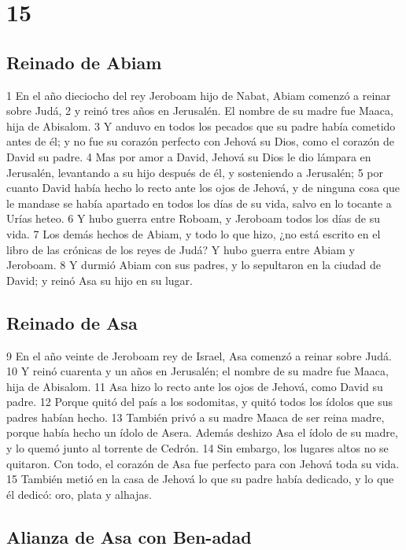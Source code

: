 \chapter{15}

\section*{Reinado de Abiam}

 

1 En el año dieciocho del rey Jeroboam hijo de Nabat, Abiam comenzó a reinar sobre Judá, 
2 y reinó tres años en Jerusalén. El nombre de su madre fue Maaca, hija de Abisalom.
3 Y anduvo en todos los pecados que su padre había cometido antes de él; y no fue su corazón perfecto con Jehová su Dios, como el corazón de David su padre.
4 Mas por amor a David, Jehová su Dios le dio lámpara en Jerusalén, levantando a su hijo después de él, y sosteniendo a Jerusalén;
5 por cuanto David había hecho lo recto ante los ojos de Jehová, y de ninguna cosa que le mandase se había apartado en todos los días de su vida, salvo en lo tocante a Urías heteo. 
6 Y hubo guerra entre Roboam, y Jeroboam todos los días de su vida. 
7 Los demás hechos de Abiam, y todo lo que hizo, ¿no está escrito en el libro de las crónicas de los reyes de Judá? Y hubo guerra entre Abiam y Jeroboam.
8 Y durmió Abiam con sus padres, y lo sepultaron en la ciudad de David; y reinó Asa su hijo en su lugar.
\section*{Reinado de Asa}

 
9 En el año veinte de Jeroboam rey de Israel, Asa comenzó a reinar sobre Judá.
10 Y reinó cuarenta y un años en Jerusalén; el nombre de su madre fue Maaca, hija de Abisalom.
11 Asa hizo lo recto ante los ojos de Jehová, como David su padre.
12 Porque quitó del país a los sodomitas, y quitó todos los ídolos que sus padres habían hecho. 
13 También privó a su madre Maaca de ser reina madre, porque había hecho un ídolo de Asera. Además deshizo Asa el ídolo de su madre, y lo quemó junto al torrente de Cedrón.
14 Sin embargo, los lugares altos no se quitaron. Con todo, el corazón de Asa fue perfecto para con Jehová toda su vida.
15 También metió en la casa de Jehová lo que su padre había dedicado, y lo que él dedicó: oro, plata y alhajas. 
\section*{Alianza de Asa con Ben-adad}

